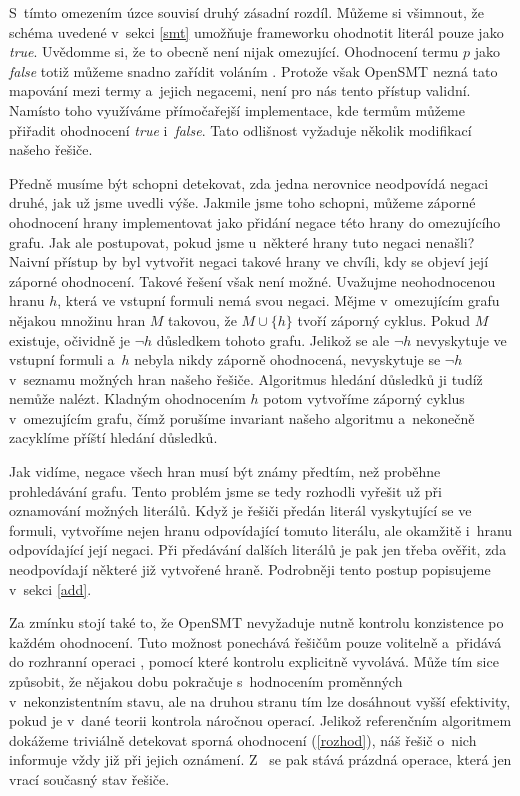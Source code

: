 S~tímto omezením úzce souvisí druhý zásadní rozdíl. Můžeme si všimnout, že schéma uvedené v~sekci \ref{smt} umožňuje frameworku ohodnotit literál pouze jako \emph{true}. Uvědomme si, že to obecně není nijak omezující. Ohodnocení termu $p$ jako \emph{false} totiž můžeme snadno zařídit voláním . Protože však OpenSMT nezná tato mapování mezi termy a~jejich negacemi, není pro nás tento přístup validní. Namísto toho využíváme přímočařejší implementace, kde termům můžeme přiřadit ohodnocení \emph{true} i~\emph{false}. Tato odlišnost vyžaduje několik modifikací našeho řešiče. 

Předně musíme být schopni detekovat, zda jedna nerovnice neodpovídá negaci druhé, jak už jsme uvedli výše. Jakmile jsme toho schopni, můžeme záporné ohodnocení hrany implementovat jako přidání negace této hrany do omezujícího grafu. Jak ale postupovat, pokud jsme u~některé hrany tuto negaci nenašli? Naivní přístup by byl vytvořit negaci takové hrany ve chvíli, kdy se objeví její záporné ohodnocení. Takové řešení však není možné. Uvažujme neohodnocenou hranu $h$, která ve vstupní formuli nemá svou negaci. Mějme v~omezujícím grafu nějakou množinu hran $M$ takovou, že $M \cup \{h\}$ tvoří záporný cyklus. Pokud $M$ existuje, očividně je $\neg h$ důsledkem tohoto grafu. Jelikož se ale $\neg h$ nevyskytuje ve vstupní formuli a~$h$ nebyla nikdy záporně ohodnocená, nevyskytuje se $\neg h$ v~seznamu možných hran našeho řešiče. Algoritmus hledání důsledků ji tudíž nemůže nalézt. Kladným ohodnocením $h$ potom vytvoříme záporný cyklus v~omezujícím grafu, čímž porušíme invariant našeho algoritmu a~nekonečně zacyklíme příští hledání důsledků.

Jak vidíme, negace všech hran musí být známy předtím, než proběhne prohledávání grafu. Tento problém jsme se tedy rozhodli vyřešit už při oznamování možných literálů. Když je řešiči předán literál vyskytující se ve formuli, vytvoříme nejen hranu odpovídající tomuto literálu, ale okamžitě i~hranu odpovídající její negaci. Při předávání dalších literálů je pak jen třeba ověřit, zda neodpovídají některé již vytvořené hraně. Podrobněji tento postup popisujeme v~sekci \ref{add}.

Za zmínku stojí také to, že OpenSMT nevyžaduje nutně kontrolu konzistence po každém ohodnocení. Tuto možnost ponechává řešičům pouze volitelně a~přidává do rozhranní operaci , pomocí které kontrolu explicitně vyvolává. Může tím sice způsobit, že nějakou dobu pokračuje s~hodnocením proměnných v~nekonzistentním stavu, ale na druhou stranu tím lze dosáhnout vyšší efektivity, pokud je v~dané teorii kontrola náročnou operací. Jelikož referenčním algoritmem dokážeme triviálně detekovat sporná ohodnocení (\ref{rozhod}), náš řešič o~nich informuje vždy již při jejich oznámení. Z~ se pak stává prázdná operace, která jen vrací současný stav řešiče.

